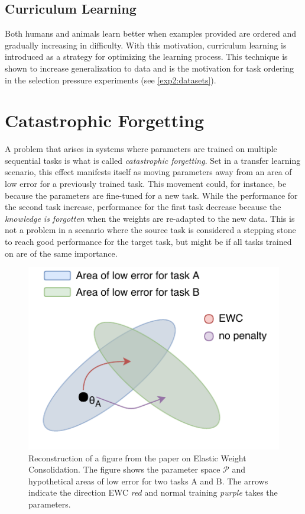 \subsection{Curriculum Learning}
Both humans and animals learn better when examples provided are ordered and gradually increasing in difficulty. With this motivation, curriculum learning is introduced as a strategy for optimizing the learning process. This technique is shown to increase generalization to data\cite{curriculumlearning} and is the motivation for task ordering in the selection pressure experiments (see \ref{exp2:datasets}).

\section{Catastrophic Forgetting}
\label{background:catastrophicforgetting}
A problem that arises in systems where parameters are trained on multiple sequential tasks is what is called \textit{catastrophic forgetting}. Set in a transfer learning scenario, this effect manifests itself as moving parameters away from an area of low error for a previously trained task. This movement could, for instance, be because the parameters are fine-tuned for a new task. While the performance for the second task increase, performance for the first task decrease because the \textit{knowledge is forgotten} when the weights are re-adapted to the new data. This is not a problem in a scenario where the source task is considered a stepping stone to reach good performance for the target task, but might be if all tasks trained on are of the same importance.

\iffalse
\begin{figure}[ht]
    \centering
    \includegraphics[width=0.7\linewidth]{Chapters/2.Background/figures/EWC.pdf}
    \caption[Elastic Weight Consolidation]{Reconstruction of a figure from the paper on Elastic Weight Consolidation\cite{ewc}. The figure shows the parameter space \(\mathcal{P}\) and hypothetical areas of low error for two tasks A and B. The arrows indicate the direction EWC \textit{red} and normal training \textit{purple} takes the parameters.}
    \label{fig:ewc}
\end{figure}
